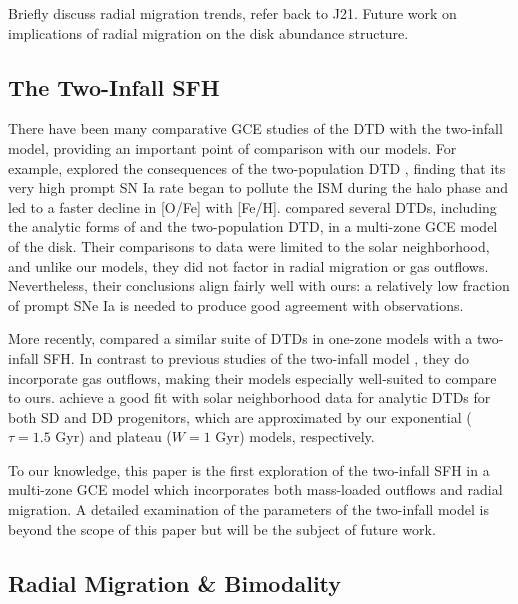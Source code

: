 \documentclass[twocolumn,twocolappendix,linenumbers]{aastex631}
\newcommand{\todo}[1]{{\color{red}#1}}
\begin{document}
\todo{Briefly discuss radial migration trends, refer back to J21. Future work on implications of radial migration on the disk abundance structure.}

\subsection{The Two-Infall SFH}
\label{sec:two-infall-discussion}

There have been many comparative GCE studies of the DTD with the two-infall model, providing an important point of comparison with our models. For example, \citet{Matteucci2006-BimodalDTDConsequences} explored the consequences of the two-population DTD \citep{Mannucci2006-TwoPopulations}, finding that its very high prompt SN Ia rate began to pollute the ISM during the halo phase and led to a faster decline in [O/Fe] with [Fe/H]. \citet{Matteucci2009-DTDModels} compared several DTDs, including the analytic forms of \citet{Greggio2005-AnalyticalRates} and the two-population DTD, in a multi-zone GCE model of the disk. Their comparisons to data were limited to the solar neighborhood, and unlike our models, they did not factor in radial migration or gas outflows. Nevertheless, their conclusions align fairly well with ours: a relatively low fraction of prompt SNe Ia is needed to produce good agreement with observations.

More recently, \citet{Palicio2023-AnalyticDTD} compared a similar suite of DTDs in one-zone models with a two-infall SFH. In contrast to previous studies of the two-infall model \citep[e.g.,][]{Chiappini1997-TwoInfall,Matteucci2009-DTDModels,Spitoni2021-TwoInfall}, they do incorporate gas outflows, making their models especially well-suited to compare to ours. \citet{Palicio2023-AnalyticDTD} achieve a good fit with solar neighborhood data for analytic DTDs for both SD and DD progenitors, which are approximated by our exponential ($\tau=1.5$ Gyr) and plateau ($W=1$ Gyr) models, respectively.

To our knowledge, this paper is the first exploration of the two-infall SFH in a multi-zone GCE model which incorporates both mass-loaded outflows and radial migration. A detailed examination of the parameters of the two-infall model is beyond the scope of this paper but will be the subject of future work.

\subsection{Radial Migration \& Bimodality}
\end{document}
